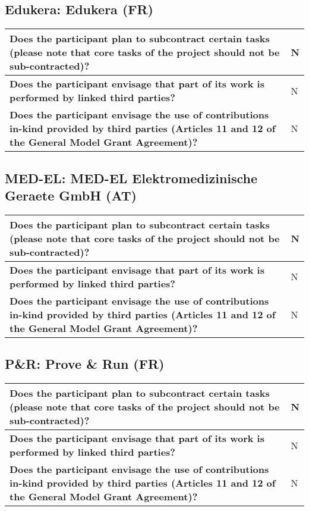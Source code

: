 \subsection*{Edukera: Edukera (FR)}

\begin{longtable*}{|p{0.75\textwidth}|p{0.2\textwidth}|}
\hline
{\bf Does the participant plan to subcontract certain tasks (please
  note that core tasks of the project should not be sub-contracted)?}
&
N
\\
\hline
{\bf Does the participant envisage that  part of its work is performed
  by linked third parties?}
&
N
\\
\hline
{\bf Does the participant envisage the use of contributions in-kind
provided by third parties (Articles 11 and 12 of the General Model
Grant Agreement)?}
&
N
\\
\hline
\end{longtable*}


\subsection*{MED-EL: MED-EL Elektromedizinische Geraete GmbH (AT)}

\begin{longtable*}{|p{0.75\textwidth}|p{0.2\textwidth}|}
\hline
{\bf Does the participant plan to subcontract certain tasks (please
  note that core tasks of the project should not be sub-contracted)?}
&
N
\\
\hline
{\bf Does the participant envisage that  part of its work is performed
  by linked third parties?}
&
N
\\
\hline
{\bf Does the participant envisage the use of contributions in-kind
provided by third parties (Articles 11 and 12 of the General Model
Grant Agreement)?}
&
N
\\
\hline
\end{longtable*}


\subsection*{P\&R: Prove \& Run (FR)}

\begin{longtable*}{|p{0.75\textwidth}|p{0.2\textwidth}|}
\hline
{\bf Does the participant plan to subcontract certain tasks (please
  note that core tasks of the project should not be sub-contracted)?}
&
N
\\
\hline
{\bf Does the participant envisage that  part of its work is performed
  by linked third parties?}
&
N
\\
\hline
{\bf Does the participant envisage the use of contributions in-kind
provided by third parties (Articles 11 and 12 of the General Model
Grant Agreement)?}
&
N
\\
\hline
\end{longtable*}


